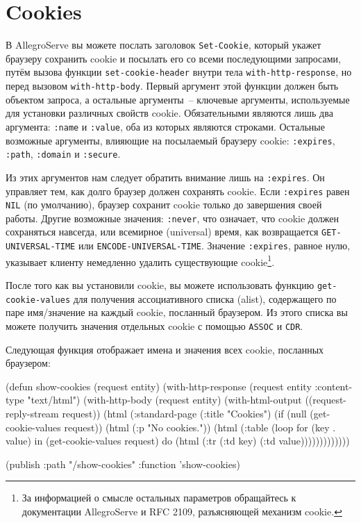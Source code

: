 \section{Cookies}

В AllegroServe вы можете послать заголовок \lstinline{Set-Cookie}, который укажет браузеру
сохранить cookie и посылать его со всеми последующими запросами, путём вызова функции
\lstinline{set-cookie-header} внутри тела \lstinline{with-http-response}, но перед вызовом
\lstinline{with-http-body}. Первый аргумент этой функции должен быть объектом запроса, а
остальные аргументы~-- ключевые аргументы, используемые для установки различных свойств
cookie. Обязательными являются лишь два аргумента: \lstinline{:name} и \lstinline{:value}, оба из
которых являются строками. Остальные возможные аргументы, влияющие на посылаемый браузеру
cookie: \lstinline{:expires}, \lstinline{:path}, \lstinline{:domain} и \lstinline{:secure}.

Из этих аргументов нам следует обратить внимание лишь на \lstinline{:expires}. Он управляет
тем, как долго браузер должен сохранять cookie. Если \lstinline{:expires} равен \lstinline{NIL}
(по умолчанию), браузер сохранит cookie только до завершения своей работы. Другие
возможные значения: \lstinline{:never}, что означает, что cookie должен сохраняться навсегда,
или всемирное (universal) время, как возвращается \lstinline{GET-UNIVERSAL-TIME} или
\lstinline{ENCODE-UNIVERSAL-TIME}. Значение \lstinline{:expires}, равное нулю, указывает клиенту
немедленно удалить существующие cookie\footnote{За информацией о смысле остальных
  параметров обращайтесь к документации AllegroServe и RFC 2109, разъясняющей механизм
  cookie.}.

После того как вы установили cookie, вы можете использовать функцию
\lstinline{get-cookie-values} для получения ассоциативного списка (alist), содержащего по паре
имя/значение на каждый cookie, посланный браузером. Из этого списка вы можете получить
значения отдельных cookie с помощью \lstinline{ASSOC} и \lstinline{CDR}.

Следующая функция отображает имена и значения всех cookie, посланных браузером:

\begin{myverb}
  (defun show-cookies (request entity)
    (with-http-response (request entity :content-type "text/html")
      (with-http-body (request entity)
        (with-html-output ((request-reply-stream request))
          (html
            (:standard-page
             (:title "Cookies")
             (if (null (get-cookie-values request))
               (html (:p "No cookies."))
               (html 
                 (:table
                   (loop for (key . value) in (get-cookie-values request)
                      do (html (:tr (:td key) (:td value)))))))))))))

  (publish :path "/show-cookies" :function 'show-cookies)
\end{myverb}

